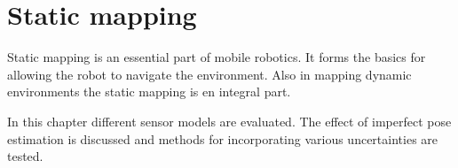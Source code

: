\chapter{Static mapping}
Static mapping is an essential part of mobile robotics. It forms the basics for allowing the robot to navigate the environment. 
Also in mapping dynamic environments the static mapping is en integral part. 

In this chapter different sensor models are evaluated. The effect of imperfect pose estimation is discussed and methods for incorporating various uncertainties are tested. 







